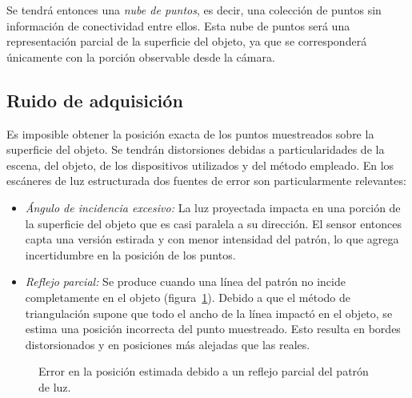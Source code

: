 Se tendrá entonces una \emph{nube de puntos}, es decir, una colección de puntos
sin información de conectividad entre ellos.
Esta nube de puntos será una representación parcial de la superficie del objeto,
ya que se corresponderá únicamente con la porción observable desde la cámara.


\subsection{Ruido de adquisición}
Es imposible obtener la posición exacta de los puntos muestreados sobre la superficie del objeto.
Se tendrán distorsiones debidas a particularidades de la escena, del objeto, de los
dispositivos utilizados y del método empleado.
En los escáneres de luz estructurada dos fuentes de error son particularmente relevantes:
\begin{itemize}
	\item \emph{Ángulo de incidencia excesivo:}
		La luz proyectada impacta en una porción de la superficie del objeto
		que es casi paralela a su dirección.
		El sensor entonces capta una versión estirada y con menor intensidad del patrón, %
		lo que agrega incertidumbre en la posición de los puntos.
	\item \emph{Reflejo parcial:}
		Se produce cuando una línea del patrón no incide completamente en el objeto (figura~\ref{fig:error_adquisicion}).
		Debido a que el método de triangulación supone que todo el ancho de la línea impactó en el objeto,
		se estima una posición incorrecta del punto muestreado.
		Esto resulta en bordes distorsionados y en posiciones más alejadas que las reales.\cite{Turk:1994:ZPM:192161.192241}
\end{itemize}

\begin{figure}
		\caption{\label{fig:error_adquisicion}Error en la posición estimada debido a un reflejo parcial del patrón de luz.}
\end{figure}

\endinput

Representación de los datos

Se puede almacenar más información que simplemente la posición de los puntos muestreados.
Por ejemplo, la intensidad del láser.

